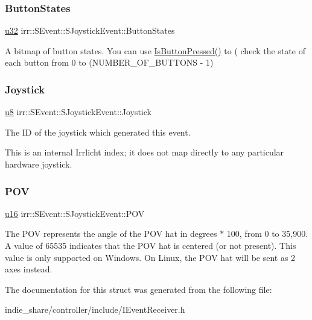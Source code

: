 \subsubsection{\texorpdfstring{Button\+States}{ButtonStates}}
{\footnotesize\ttfamily \hyperlink{namespaceirr_a0416a53257075833e7002efd0a18e804}{u32} irr\+::\+S\+Event\+::\+S\+Joystick\+Event\+::\+Button\+States}

A bitmap of button states. You can use \hyperlink{structirr_1_1SEvent_1_1SJoystickEvent_a618eae5c6218fc9d3b93e68038ca97f2}{Is\+Button\+Pressed()} to ( check the state of each button from 0 to (N\+U\+M\+B\+E\+R\+\_\+\+O\+F\+\_\+\+B\+U\+T\+T\+O\+NS -\/ 1) \mbox{\label{structirr_1_1SEvent_1_1SJoystickEvent_a04424b44a1c3370263afb3af501cae44}} 
\subsubsection{\texorpdfstring{Joystick}{Joystick}}
{\footnotesize\ttfamily \hyperlink{namespaceirr_a646874f69af8ff87fc10201b0254a761}{u8} irr\+::\+S\+Event\+::\+S\+Joystick\+Event\+::\+Joystick}



The ID of the joystick which generated this event. 

This is an internal Irrlicht index; it does not map directly to any particular hardware joystick. \mbox{\label{structirr_1_1SEvent_1_1SJoystickEvent_af30285332d154507b9752ffde3f6bf84}} 
\subsubsection{\texorpdfstring{P\+OV}{POV}}
{\footnotesize\ttfamily \hyperlink{namespaceirr_ae9f8ec82692ad3b83c21f555bfa70bcc}{u16} irr\+::\+S\+Event\+::\+S\+Joystick\+Event\+::\+P\+OV}

The P\+OV represents the angle of the P\+OV hat in degrees $\ast$ 100, from 0 to 35,900. A value of 65535 indicates that the P\+OV hat is centered (or not present). This value is only supported on Windows. On Linux, the P\+OV hat will be sent as 2 axes instead. 

The documentation for this struct was generated from the following file\+:\begin{DoxyCompactItemize}
\item 
indie\+\_\+share/controller/include/I\+Event\+Receiver.\+h\end{DoxyCompactItemize}
